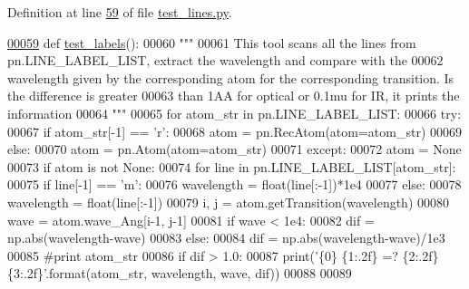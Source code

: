 Definition at line \hyperlink{test__lines_8py_source_l00059}{59} of file \hyperlink{test__lines_8py_source}{test\+\_\+lines.\+py}.


\begin{DoxyCode}
\hypertarget{namespacepyneb_1_1test_1_1test__lines_l00059}{}\hyperlink{namespacepyneb_1_1test_1_1test__lines_a59a9d4f79b935f54e1a4fe6186b4e539}{00059} \textcolor{keyword}{def }\hyperlink{namespacepyneb_1_1test_1_1test__lines_a59a9d4f79b935f54e1a4fe6186b4e539}{test\_labels}():
00060     \textcolor{stringliteral}{"""}
00061 \textcolor{stringliteral}{    This tool scans all the lines from pn.LINE\_LABEL\_LIST, extract the wavelength and compare with the }
00062 \textcolor{stringliteral}{    wavelength given by the corresponding atom for the corresponding transition. Is the difference is
       greater }
00063 \textcolor{stringliteral}{    than 1AA for optical or 0.1mu for IR, it prints the information}
00064 \textcolor{stringliteral}{    """}
00065     \textcolor{keywordflow}{for} atom\_str \textcolor{keywordflow}{in} pn.LINE\_LABEL\_LIST:
00066         \textcolor{keywordflow}{try}:
00067             \textcolor{keywordflow}{if} atom\_str[-1] == \textcolor{stringliteral}{'}\textcolor{stringliteral}{r':}
00068 \textcolor{stringliteral}{                atom = pn.RecAtom(atom=atom\_str)}
00069 \textcolor{stringliteral}{            }\textcolor{keywordflow}{else}:
00070                 atom = pn.Atom(atom=atom\_str)
00071         \textcolor{keywordflow}{except}:
00072             atom = \textcolor{keywordtype}{None}
00073         \textcolor{keywordflow}{if} atom \textcolor{keywordflow}{is} \textcolor{keywordflow}{not} \textcolor{keywordtype}{None}:
00074             \textcolor{keywordflow}{for} line \textcolor{keywordflow}{in} pn.LINE\_LABEL\_LIST[atom\_str]:
00075                 \textcolor{keywordflow}{if} line[-1] == \textcolor{stringliteral}{'m'}:
00076                     wavelength = float(line[:-1])*1e4
00077                 \textcolor{keywordflow}{else}:
00078                     wavelength = float(line[:-1])
00079                 i, j = atom.getTransition(wavelength)
00080                 wave = atom.wave\_Ang[i-1, j-1]
00081                 \textcolor{keywordflow}{if} wave < 1e4:
00082                     dif = np.abs(wavelength-wave)
00083                 \textcolor{keywordflow}{else}:
00084                     dif = np.abs(wavelength-wave)/1e3
00085                 \textcolor{comment}{#print atom\_str}
00086                 \textcolor{keywordflow}{if} dif > 1.0:
00087                     print(\textcolor{stringliteral}{'\{0\} \{1:.2f\} =? \{2:.2f\}  \{3:.2f\}'}.format(atom\_str, wavelength, wave, dif))
00088                     
00089 
\end{DoxyCode}
\hypertarget{namespacepyneb_1_1test_1_1test__lines_af8bbc40c02e8cac6dcd70407e6382974}{}
